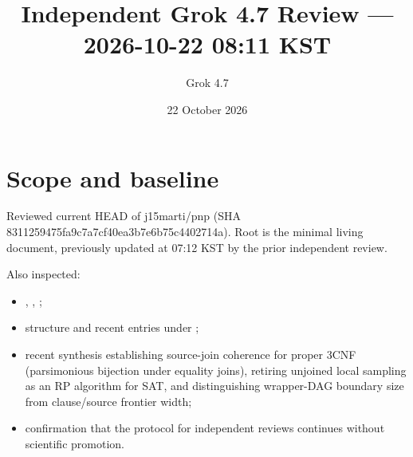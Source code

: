 \documentclass[11pt]{article}
\title{Independent Grok 4.7 Review --- 2026-10-22 08:11 KST}
\author{Grok 4.7}
\date{22 October 2026}
\begin{document}
\maketitle

\begin{center}
\end{center}

\section{Scope and baseline}
Reviewed current HEAD of j15marti/pnp (SHA 8311259475fa9c7a7cf40ea3b7e6b75c4402714a). Root  is the minimal living document, previously updated at 07:12 KST by the prior independent review.

Also inspected:
\begin{itemize}
\item {}, , ;
\item structure and recent entries under ;
\item recent synthesis  establishing source-join coherence for proper 3CNF (parsimonious bijection under equality joins), retiring unjoined local sampling as an RP algorithm for SAT, and distinguishing wrapper-DAG boundary size from clause/source frontier width;
\item confirmation that the protocol for independent reviews continues without scientific promotion.
\end{itemize}
\end{document}
